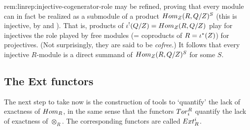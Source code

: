 \begin{rem}{}{rem:linrep:injective-cogenerator-role}
   may be refined, proving that every
  module can in fact be realized as a submodule of a product
  $Hom_{Z}(R, Q/Z)^S$ (this is injective, by
   and
  ).  That is,
  products of $\iota^!(Q/Z) = Hom_{Z}(R, Q/Z)$ play for
  injectives the role played by free modules (= coproducts of
  $R = \iota^*(Z)$) for projectives. (Not surprisingly, they are said
  to be \emph{cofree}.)  It follows that every injective $R$-module is
  a direct summand of $Hom_{Z}(R, Q/Z)^S$ for some $S$.
\end{rem}

\subsection{The Ext functors}
\label{subsec:linrep:the-ext-functors}
The next step to take now is the construction of tools to `quantify'
the lack of exactness of $Hom_R$, in the same sense that the functors
$Tor^R_i$ quantify the lack of exactness of $\otimes_R$. The
corresponding functors are called $Ext^i_R$.

